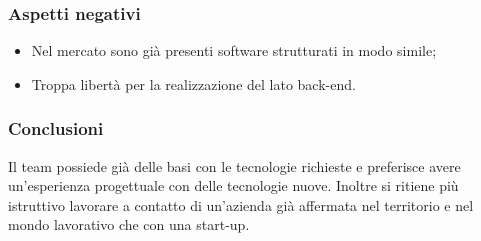 		\subsubsection{Aspetti negativi}
		\begin{itemize}
			\item Nel mercato sono già presenti software strutturati in modo simile;
			\item Troppa libertà per la realizzazione del lato back-end.
		\end{itemize}
		\subsubsection{Conclusioni}
		Il team possiede già delle basi con le tecnologie richieste e preferisce avere un'esperienza progettuale con delle tecnologie nuove. Inoltre si ritiene più istruttivo lavorare a contatto di un'azienda già affermata nel territorio e nel mondo lavorativo che con una start-up.
	
	